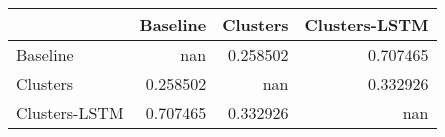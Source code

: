 \begin{tabular}{lrrr}
\toprule
               &   Baseline &   Clusters &   Clusters-LSTM \\
\midrule
 Baseline      & nan        &   0.258502 &        0.707465 \\
 Clusters      &   0.258502 & nan        &        0.332926 \\
 Clusters-LSTM &   0.707465 &   0.332926 &      nan        \\
\bottomrule
\end{tabular}